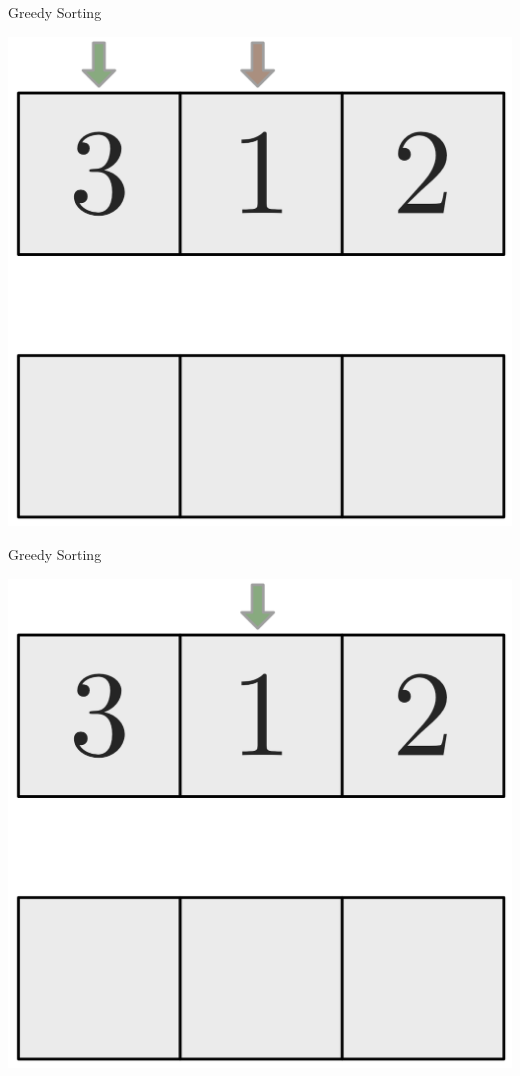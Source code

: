 \documentclass[10pt]{beamer}
\begin{document}
\begin{frame}[fragile]{Greedy Sorting}
    \begin{center}
        \includegraphics[height=.4\textheight]{Images/Bubblesort/Bubblesort_03}
    \end{center}
\end{frame}

\begin{frame}[fragile]{Greedy Sorting}
    \begin{center}
        \includegraphics[height=.4\textheight]{Images/Bubblesort/Bubblesort_04}
    \end{center}
\end{frame}
\end{document}
